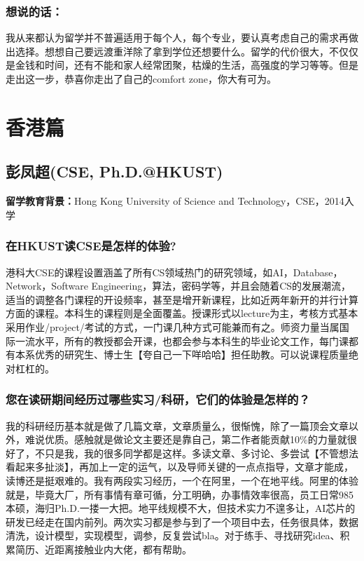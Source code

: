 \documentclass[a4paper,UTF8]{book}
\begin{document}
    \subsubsection{想说的话：}
    我从来都认为留学并不普遍适用于每个人，每个专业，要认真考虑自己的需求再做出选择。想想自己要远渡重洋除了拿到学位还想要什么。留学的代价很大，不仅仅是金钱和时间，还有不能和家人经常团聚，枯燥的生活，高强度的学习等等。但是走出这一步，恭喜你走出了自己的comfort zone，你大有可为。





\clearpage
\section{香港篇}

\subsection{彭凤超(CSE, Ph.D.@HKUST)}
    \textbf{留学教育背景：}Hong Kong University of Science and Technology，CSE，2014入学

    \subsubsection*{在HKUST读CSE是怎样的体验?}
    港科大CSE的课程设置涵盖了所有CS领域热门的研究领域，如AI，Database，Network，Software Engineering，算法，密码学等，并且会随着CS的发展潮流，适当的调整各门课程的开设频率，甚至是增开新课程，比如近两年新开的并行计算方面的课程。本科生的课程则是全面覆盖。授课形式以lecture为主，考核方式基本采用作业/project/考试的方式，一门课几种方式可能兼而有之。师资力量当属国际一流水平，所有的教授都会开课，也都会参与本科生的毕业论文工作，每门课都有本系优秀的研究生、博士生【夸自己一下咩哈哈】担任助教。可以说课程质量绝对杠杠的。
    \subsubsection*{您在读研期间经历过哪些实习/科研，它们的体验是怎样的？}
    我的科研经历基本就是做了几篇文章，文章质量么，很惭愧，除了一篇顶会文章以外，难说优质。感触就是做论文主要还是靠自己，第二作者能贡献10\%的力量就很好了，不只是我，我的很多同学都是这样。多读文章、多讨论、多尝试【不管想法看起来多扯淡】，再加上一定的运气，以及导师关键的一点点指导，文章才能成，读博还是挺艰难的。我有两段实习经历，一个在阿里，一个在地平线。阿里的体验就是，毕竟大厂，所有事情有章可循，分工明确，办事情效率很高，员工日常985本硕，海归Ph.D.一搂一大把。地平线规模不大，但技术实力不遑多让，AI芯片的研发已经走在国内前列。两次实习都是参与到了一个项目中去，任务很具体，数据清洗，设计模型，实现模型，调参，反复尝试bla。对于练手、寻找研究idea、积累简历、近距离接触业内大佬，都有帮助。
\end{document}
